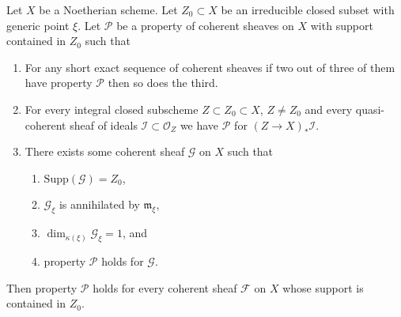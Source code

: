 \begin{lemma}
\label{lemma-property-irreducible}
Let $X$ be a Noetherian scheme. Let $Z_0 \subset X$ be an irreducible closed
subset with generic point $\xi$. Let $\mathcal{P}$ be a property of coherent
sheaves on $X$ with support contained in $Z_0$ such that
\begin{enumerate}
\item For any short exact sequence of coherent sheaves if two
out of three of them have property $\mathcal{P}$ then so does the
third.
\item For every integral closed subscheme $Z \subset Z_0 \subset X$,
$Z \not = Z_0$ and every quasi-coherent sheaf of ideals
$\mathcal{I} \subset \mathcal{O}_Z$ we have
$\mathcal{P}$ for $(Z \to X)_*\mathcal{I}$.
\item There exists some coherent sheaf $\mathcal{G}$ on $X$ such that
\begin{enumerate}
\item $\text{Supp}(\mathcal{G}) = Z_0$,
\item $\mathcal{G}_\xi$ is annihilated by $\mathfrak m_\xi$,
\item $\dim_{\kappa(\xi)} \mathcal{G}_\xi = 1$, and
\item property $\mathcal{P}$ holds for $\mathcal{G}$.
\end{enumerate}
\end{enumerate}
Then property $\mathcal{P}$ holds for every coherent sheaf
$\mathcal{F}$ on $X$ whose support is contained in $Z_0$.
\end{lemma}

